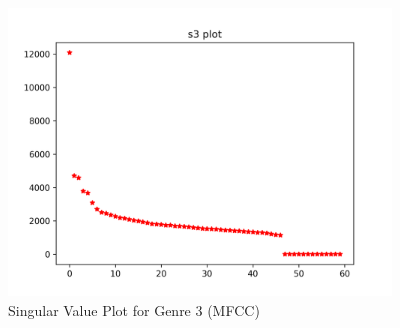 \begin{par}
    \begin{figure}[H]
        \centering
        \includegraphics[width=4in]{image/s3_plot_mfcc.png}
        \caption{Singular Value Plot for Genre 3 (MFCC)}
        \label{fig:mfcc_svd}
    \end{figure}
    \end{par}